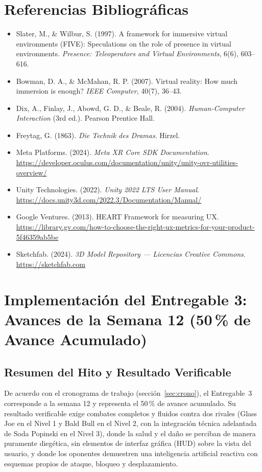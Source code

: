 \section{Referencias Bibliográficas}
\begin{itemize}[label={},leftmargin=0pt,itemsep=5pt]
  \item Slater, M., \& Wilbur, S. (1997). A framework for immersive virtual environments (FIVE): Speculations on the role of presence in virtual environments. \emph{Presence: Teleoperators and Virtual Environments}, 6(6), 603--616.
  \item Bowman, D. A., \& McMahan, R. P. (2007). Virtual reality: How much immersion is enough? \emph{IEEE Computer}, 40(7), 36--43.
  \item Dix, A., Finlay, J., Abowd, G. D., \& Beale, R. (2004). \emph{Human-Computer Interaction} (3rd ed.). Pearson Prentice Hall.
  \item Freytag, G. (1863). \emph{Die Technik des Dramas}. Hirzel.
  \item Meta Platforms. (2024). \emph{Meta XR Core SDK Documentation}. \url{https://developer.oculus.com/documentation/unity/unity-ovr-utilities-overview/}
  \item Unity Technologies. (2022). \emph{Unity 2022 LTS User Manual}. \url{https://docs.unity3d.com/2022.3/Documentation/Manual/}
  \item Google Ventures. (2013). HEART Framework for measuring UX. \url{https://library.gv.com/how-to-choose-the-right-ux-metrics-for-your-product-5f46359ab5be}
  \item Sketchfab. (2024). \emph{3D Model Repository --- Licencias Creative Commons}. \url{https://sketchfab.com}
\end{itemize}

\section{Implementación del Entregable 3: Avances de la Semana 12 (50\,\% de Avance Acumulado)}
\label{sec:e2e3}
\subsection{Resumen del Hito y Resultado Verificable}
De acuerdo con el cronograma de trabajo (sección~\ref{sec:crono}), el Entregable~3 corresponde a la semana 12 y representa el 50\,\% de avance acumulado. Su resultado verificable exige combates completos y fluidos contra dos rivales (Glass Joe en el Nivel 1 y Bald Bull en el Nivel 2, con la integración técnica adelantada de Soda Popinski en el Nivel 3), donde la salud y el daño se perciban de manera puramente diegética, sin elementos de interfaz gráfica (HUD) sobre la vista del usuario, y donde los oponentes demuestren una inteligencia artificial reactiva con esquemas propios de ataque, bloqueo y desplazamiento.

